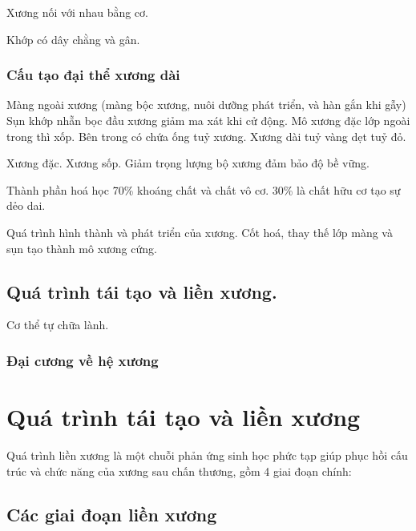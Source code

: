 Xương nối với nhau bằng cơ.

Khớp có dây chằng và gân.
\subsubsection{Cấu tạo đại thể xương dài}
Màng ngoài xương (màng bộc xương, nuôi dưỡng phát triển, và hàn gắn khi gẫy)
Sụn khớp nhẵn bọc đầu xương giảm ma xát khi cử động.
Mô xương đặc lớp ngoài trong thì xốp. Bên trong có chứa ống tuỷ xương. Xương dài tuỷ vàng dẹt tuỷ đỏ.

Xương đặc.
Xương sốp. Giảm trọng lượng bộ xương đảm bảo độ bề vững.

Thành phần hoá học 70\% khoáng chất và chất vô cơ. 30\% là chất hữu cơ tạo sự dẻo dai.

Quá trình hình thành và phát triển của xương.
Cốt hoá, thay thế lớp màng và sụn tạo thành mô xương cứng.

\subsection{Quá trình tái tạo và liền xương.}
Cơ thể tự chữa lành.

\subsubsection{Đại cương về hệ xương}

\section{Quá trình tái tạo và liền xương}

Quá trình liền xương là một chuỗi phản ứng sinh học phức tạp giúp phục hồi cấu trúc và chức năng của xương sau chấn thương, gồm 4 giai đoạn chính:

\subsection{Các giai đoạn liền xương}

